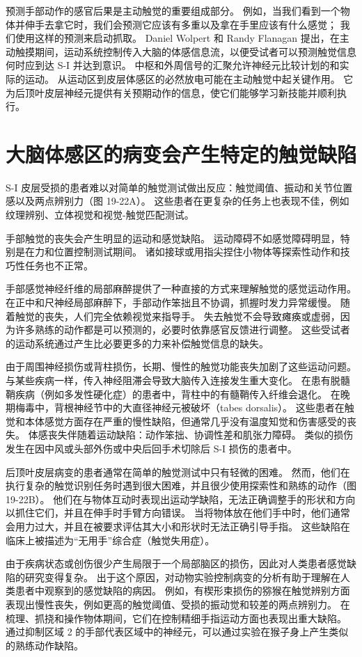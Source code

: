 预测手部动作的感官后果是主动触觉的重要组成部分。 例如，当我们看到一个物体并伸手去拿它时，我们会预测它应该有多重以及拿在手里应该有什么感觉； 我们使用这样的预测来启动抓取。 Daniel Wolpert 和 Randy Flanagan 提出，在主动触摸期间，运动系统控制传入大脑的体感信息流，以便受试者可以预测触觉信息何时应到达 S-I 并达到意识。 中枢和外周信号的汇聚允许神经元比较计划的和实际的运动。 从运动区到皮层体感区的必然放电可能在主动触觉中起关键作用。 它为后顶叶皮层神经元提供有关预期动作的信息，使它们能够学习新技能并顺利执行。


\section{大脑体感区的病变会产生特定的触觉缺陷}

S-I 皮层受损的患者难以对简单的触觉测试做出反应：触觉阈值、振动和关节位置感以及两点辨别力（图 19-22A）。 这些患者在更复杂的任务上也表现不佳，例如纹理辨别、立体视觉和视觉-触觉匹配测试。

手部触觉的丧失会产生明显的运动和感觉缺陷。 运动障碍不如感觉障碍明显，特别是在力和位置控制测试期间。 诸如接球或用指尖捏住小物体等探索性动作和技巧性任务也不正常。

手部感觉神经纤维的局部麻醉提供了一种直接的方式来理解触觉的感觉运动作用。 在正中和尺神经局部麻醉下，手部动作笨拙且不协调，抓握时发力异常缓慢。 随着触觉的丧失，人们完全依赖视觉来指导手。 失去触觉不会导致瘫痪或虚弱，因为许多熟练的动作都是可以预测的，必要时依靠感官反馈进行调整。 这些受试者的运动系统通过产生比必要更多的力来补偿触觉信息的缺失。

由于周围神经损伤或背柱损伤，长期、慢性的触觉功能丧失加剧了这些运动问题。 与某些疾病一样，传入神经阻滞会导致大脑传入连接发生重大变化。 在患有脱髓鞘疾病（例如多发性硬化症）的患者中，背柱中的有髓鞘传入纤维会退化。 在晚期梅毒中，背根神经节中的大直径神经元被破坏（tabes dorsalis）。 这些患者在触觉和本体感觉方面存在严重的慢性缺陷，但通常几乎没有温度知觉和伤害感受的丧失。 体感丧失伴随着运动缺陷：动作笨拙、协调性差和肌张力障碍。 类似的损伤发生在因中风或头部外伤或中央后回手术切除后 S-I 损伤的患者中。

后顶叶皮层病变的患者通常在简单的触觉测试中只有轻微的困难。 然而，他们在执行复杂的触觉识别任务时遇到很大困难，并且很少使用探索性和熟练的动作（图 19-22B）。 他们在与物体互动时表现出运动学缺陷，无法正确调整手的形状和方向以抓住它们，并且在伸手时手臂方向错误。 当将物体放在他们手中时，他们通常会用力过大，并且在被要求评估其大小和形状时无法正确引导手指。 这些缺陷在临床上被描述为“无用手”综合症（触觉失用症）。

由于疾病状态或创伤很少产生局限于一个局部脑区的损伤，因此对人类患者感觉缺陷的研究变得复杂。 出于这个原因，对动物实验控制病变的分析有助于理解在人类患者中观察到的感觉缺陷的病因。 例如，有楔形束损伤的猕猴在触觉辨别方面表现出慢性丧失，例如更高的触觉阈值、受损的振动觉和较差的两点辨别力。 在梳理、抓挠和操作物体期间，它们在控制精细手指运动方面也表现出重大缺陷。 通过抑制区域 2 的手部代表区域中的神经元，可以通过实验在猴子身上产生类似的熟练动作缺陷。


